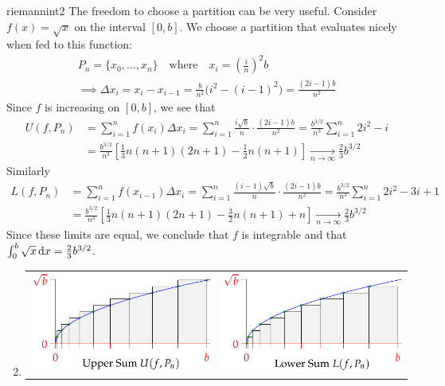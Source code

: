 \begin{examples}{}{riemannint2}
\exstart The freedom to choose a partition can be very useful. Consider $f(x)=\sqrt x$ on the interval $[0,b]$. We choose a partition that evaluates nicely when fed to this function:
  \begin{gather*}
  P_n=\{x_0,\ldots,x_n\}\quad\text{where}\quad x_i=\left(\frac in\right)^2b\\
  \implies \Delta x_i=x_i-x_{i-1}=\frac b{n^2}\bigl(i^2-(i-1)^2\bigr)=\frac{(2i-1)b}{n^2}
  \end{gather*}
  Since $f$ is increasing on $[0,b]$, we see that
  \begin{align*}
  U(f,P_n)&=\sum_{i=1}^nf(x_i)\Delta x_i =\sum_{i=1}^n\frac{i\sqrt b}n\cdot\frac{(2i-1)b}{n^2} =\frac{b^{3/2}}{n^3}\sum_{i=1}^n2i^2-i \\
  &=\frac{b^{3/2}}{n^3}\left[\frac 13n(n+1)(2n+1)-\frac 12n(n+1)\right] \xrightarrow[n\to\infty]{}\frac 23b^{3/2}
  \end{align*}
  Similarly
  \begin{align*}
  L(f,P_n)&=\sum_{i=1}^nf(x_{i-1})\Delta x_i =\sum_{i=1}^n\frac{(i-1)\sqrt b}n\cdot\frac{(2i-1)b}{n^2} =\frac{b^{3/2}}{n^3}\sum_{i=1}^n2i^2-3i+1 \\
  &=\frac{b^{3/2}}{n^3}\left[\frac 13n(n+1)(2n+1)-\frac 32n(n+1) +n\right] \xrightarrow[n\to\infty]{}\frac 23b^{3/2}
  \end{align*}
  Since these limits are equal, we conclude that $f$ is integrable and that $\int_0^b\sqrt x\,{\mathrm{d} x}=\frac 23b^{3/2}$.

\begin{enumerate}\setcounter{enumi}{1}
  \item[]\begin{center}
  \begin{tabular}{c@{\qquad}c}
  \includegraphics{darboux-ex1}
  &
  \includegraphics{darboux-ex2}
  \end{tabular}
  \end{center}
  

\end{enumerate}
\end{examples}

